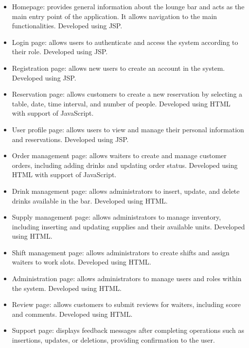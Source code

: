 \documentclass[a4paper]{article}
\begin{document}
\begin{itemize}
    \item Homepage: provides general information about the lounge bar and acts as the main entry point of the application. It allows navigation to the main functionalities. Developed using JSP.
    
    \item Login page: allows users to authenticate and access the system according to their role. Developed using JSP.
    
    \item Registration page: allows new users to create an account in the system. Developed using JSP.
    
    \item Reservation page: allows customers to create a new reservation by selecting a table, date, time interval, and number of people. Developed using HTML with support of JavaScript.
    
    \item User profile page: allows users to view and manage their personal information and reservations. Developed using JSP.
    
    \item Order management page: allows waiters to create and manage customer orders, including adding drinks and updating order status. Developed using HTML with support of JavaScript.
    
    \item Drink management page: allows administrators to insert, update, and delete drinks available in the bar. Developed using HTML.
    
    \item Supply management page: allows administrators to manage inventory, including inserting and updating supplies and their available units. Developed using HTML.
    
    \item Shift management page: allows administrators to create shifts and assign waiters to work slots. Developed using HTML.
    
    \item Administration page: allows administrators to manage users and roles within the system. Developed using HTML.
    
    \item Review page: allows customers to submit reviews for waiters, including score and comments. Developed using HTML.
    
    \item Support page: displays feedback messages after completing operations such as insertions, updates, or deletions, providing confirmation to the user.
\end{itemize}
\end{document}

